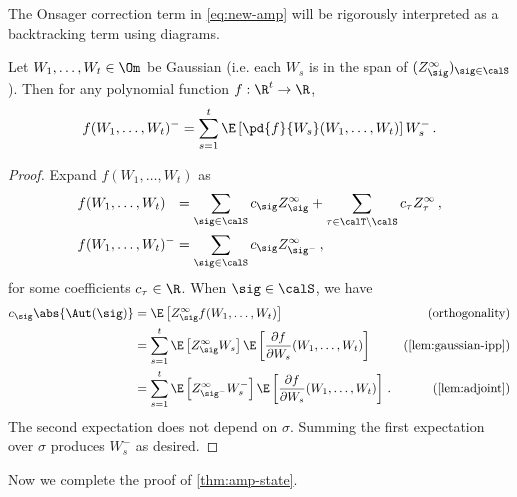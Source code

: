 \documentclass[12pt]{article}
\begin{document}
The Onsager correction term in \cref{eq:new-amp} will be rigorously interpreted as a backtracking term using diagrams.


\begin{lemma}\label{lem:taylor-expand}
    Let $W_1, \dots, W_t \in \Om$ be Gaussian (i.e. each $W_s$ is
    in the span of $(Z^\infty_\sig)_{\sig \in \calS}$). Then for any polynomial function $f : \R^t \to \R$,
    \[
        f(W_1, \dots, W_t)^- = \sum_{s = 1}^t  \E\left[\pd{f}{W_s}(W_1, \dots, W_t)\right] W_s^-\,.
    \]
\end{lemma}

\begin{proof}
    Expand $f(W_1, \dots, W_t)$ as
    \begin{align*}
    f(W_1,\ldots,W_t)^{\phantom{-}} &= \sum_{\sig \in \calS} c_\sig Z^\infty_\sig + \sum_{\tau \in \calT \setminus \calS} c_\tau Z^\infty_\tau\,,\\
    f(W_1,\ldots,W_t)^- &= \sum_{\sig \in \calS} c_\sig Z^\infty_{\sig^-}\,,
    \end{align*}
    for some coefficients $c_\tau\in\R$. When $\sig \in \calS$, we have
    \begin{align*}
    c_\sig\abs{\Aut(\sig)} &= \E \left[Z^\infty_\sig f(W_1,\ldots,W_t)\right] & (\text{orthogonality})\\
    &= \sum_{s=1}^{t} \E \left[Z_\sig^\infty W_s \right] \E \left[\frac{\partial f}{\partial W_s}(W_1,\ldots,W_t)\right] & (\text{\cref{lem:gaussian-ipp}})\\
    &= \sum_{s=1}^{t} \E \left[Z_{\sig^-}^\infty W_s^- \right] \E \left[\frac{\partial f}{\partial W_s}(W_1,\ldots,W_t)\right]\,. & (\text{\cref{lem:adjoint}})
    \end{align*}
    The second expectation does not depend on $\sigma$.
    Summing the first expectation over $\sigma$ produces $W_s^-$ as desired.
\end{proof}


Now we complete the proof of \cref{thm:amp-state}.
\end{document}
